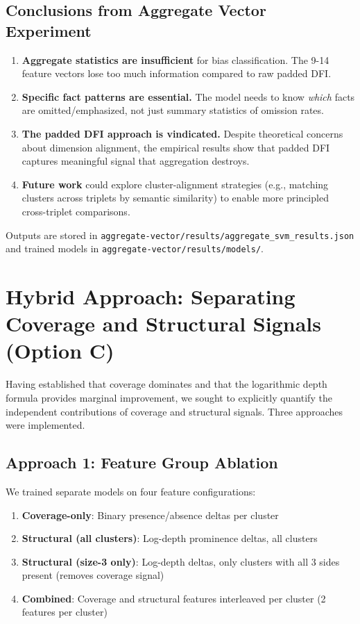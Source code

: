 \documentclass[12pt,a4paper]{article}
\begin{document}
\subsection{Conclusions from Aggregate Vector Experiment}

\begin{enumerate}
\item \textbf{Aggregate statistics are insufficient} for bias classification.
      The 9-14 feature vectors lose too much information compared to raw padded DFI.

\item \textbf{Specific fact patterns are essential.}
      The model needs to know \textit{which} facts are omitted/emphasized, not just
      summary statistics of omission rates.

\item \textbf{The padded DFI approach is vindicated.}
      Despite theoretical concerns about dimension alignment, the empirical results
      show that padded DFI captures meaningful signal that aggregation destroys.

\item \textbf{Future work} could explore cluster-alignment strategies (e.g., matching
      clusters across triplets by semantic similarity) to enable more principled
      cross-triplet comparisons.
\end{enumerate}

Outputs are stored in \texttt{aggregate-vector/results/aggregate\_svm\_results.json}
and trained models in \texttt{aggregate-vector/results/models/}.

\section{Hybrid Approach: Separating Coverage and Structural Signals (Option C)}

Having established that coverage dominates and that the logarithmic depth formula provides
marginal improvement, we sought to explicitly quantify the independent contributions of
coverage and structural signals. Three approaches were implemented.

\subsection{Approach 1: Feature Group Ablation}

We trained separate models on four feature configurations:
\begin{enumerate}
\item \textbf{Coverage-only}: Binary presence/absence deltas per cluster
\item \textbf{Structural (all clusters)}: Log-depth prominence deltas, all clusters
\item \textbf{Structural (size-3 only)}: Log-depth deltas, only clusters with all 3 sides present (removes coverage signal)
\item \textbf{Combined}: Coverage and structural features interleaved per cluster (2 features per cluster)
\end{enumerate}
\end{document}
